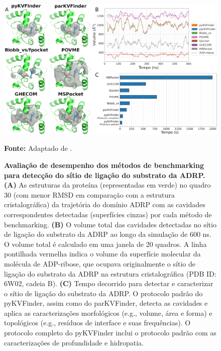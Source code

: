 \documentclass[Portugues]{phdquali}
\def\eg{e.g.\onedot}
\begin{document}
\begin{figure}[h]
  \centering
  \includegraphics[scale=0.75]{images/pykvfinder-benchmarking.png}
  \centerline{\scriptsize{\textbf{Fonte:} Adaptado de \cite{guerra2021}.}}
  \caption[Avaliação de desempenho dos métodos de benchmarking para detecção do sítio de ligação do substrato da ADRP]{\textbf{Avaliação de desempenho dos métodos de benchmarking para detecção do sítio de ligação do substrato da ADRP.} \textbf{(A)} As estruturas da proteína (representadas em verde) no quadro 30 (com menor RMSD em comparação com a estrutura cristalográfica) da trajetória do domínio ADRP com as cavidades correspondentes detectadas (superfícies cinzas) por cada método de benchmarking. \textbf{(B)} O volume total das cavidades detectadas no sítio de ligação do substrato da ADRP ao longo da simulação de 600 ns. O volume total é calculado em uma janela de 20 quadros. A linha pontilhada vermelha indica o volume da superfície molecular da molécula de ADP-ribose, que ocupava originalmente o sítio de ligação do substrato da ADRP na estrutura cristalográfica (PDB ID: 6W02, cadeia B). \textbf{(C)} Tempo decorrido para detectar e caracterizar o sítio de ligação do substrato da ADRP. O protocolo padrão do pyKVFinder, assim como do parKVFinder, detecta as cavidades e aplica as caracterizações morfológicos (\eg, volume, área e forma) e topológicos (\eg, resíduos de interface e suas frequências). O protocolo completo do pyKVFinder inclui o protocolo padrão com as caracterizações de profundidade e hidropatia.}
  \label{fig:pykvfinder-benchmarking}
\end{figure}
\end{document}
